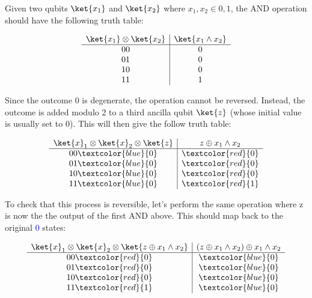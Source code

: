 Given two qubits $\ket{x_1}$ and $\ket{x_2}$ where $x_1, x_2\in {0,1}$, the AND operation should have the following truth table:

\begin{equation}
\begin{array}{c|c}
    \ket{x_1} \otimes \ket{x_2} & \ket{x_1\wedge x_2} \\
    \hline
    00 & 0 \\
    01 & 0 \\
    10 & 0 \\
    11 & 1 \\
\end{array}
\end{equation}

Since the outcome 0 is degenerate, the operation cannot be reversed. Instead, the outcome is added modulo 2 to a third ancilla qubit $\ket{z}$ (whose initial value is usually set to 0). This will then give the follow truth table:

\begin{equation}
\begin{array}{c|c}
    \ket{x}_1 \otimes \ket{x}_2 \otimes \ket{z} & z \oplus x_1\wedge x_2 \\
    \hline
    00\textcolor{blue}{0} & \textcolor{red}{0} \\
    01\textcolor{blue}{0} & \textcolor{red}{0} \\
    10\textcolor{blue}{0} & \textcolor{red}{0} \\
    11\textcolor{blue}{0} & \textcolor{red}{1} \\
\end{array}
\end{equation}

To check that this process is reversible, let's perform the same operation where z is now the the output of the first AND above. This should map back to the original \textcolor{blue}{0} states:

\begin{equation}
\begin{array}{c|c}
    \ket{x}_1 \otimes \ket{x}_2 \otimes \ket{z \oplus x_1\wedge x_2} & (z \oplus x_1\wedge x_2) \oplus x_1\wedge x_2 \\
    \hline
    00\textcolor{red}{0} & \textcolor{blue}{0} \\
    01\textcolor{red}{0} & \textcolor{blue}{0} \\
    10\textcolor{red}{0} & \textcolor{blue}{0} \\
    11\textcolor{red}{1} & \textcolor{blue}{0} \\
\end{array}
\end{equation}


